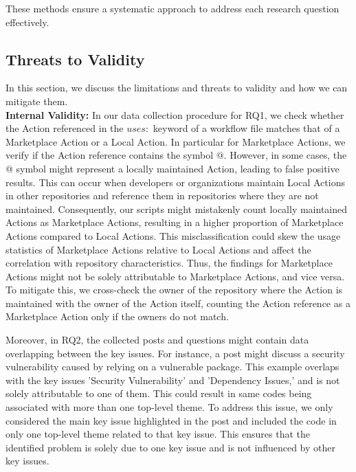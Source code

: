 \documentclass[conference]{IEEEtran}
\begin{document}
These methods ensure a systematic approach to address each research question effectively.\\


    \subsection{Threats to Validity}
        In this section, we discuss the limitations and threats to
        validity and how we can mitigate them.\\

       \textbf{Internal Validity:} In our data collection procedure for RQ1, we check whether the Action referenced in the $uses:$ keyword of a workflow file matches  that of a Marketplace Action or a Local Action. In particular for Marketplace Actions, we verify if the
Action reference contains the symbol $@$. However, in some cases, the $@$ symbol might represent a locally maintained Action, leading to false positive results.  This can occur when developers or organizations maintain Local Actions in other repositories and reference them in repositories where they are not maintained. Consequently, our scripts might mistakenly count locally maintained Actions as Marketplace Actions, resulting in a higher proportion of Marketplace Actions compared to Local Actions. This misclassification could skew the usage statistics of Marketplace Actions relative to Local Actions and affect the correlation with repository characteristics. Thus, the findings for Marketplace Actions might not be solely attributable to Marketplace Actions, and vice versa. To mitigate this, we cross-check the owner of the repository where the Action is maintained with the owner of the Action itself, counting the Action reference as a Marketplace Action only if the owners do not match.

	Moreover, in RQ2, the collected posts and questions might contain data overlapping between the key issues. For instance, a post might discuss a security vulnerability caused by relying on a vulnerable package. This example overlaps with the key issues 'Security Vulnerability' and 'Dependency Issues,' and is not solely attributable to one of them. This could result in same codes being associated with more than one top-level theme. To address this issue, we only considered the main key issue highlighted in the post and included the code in only one top-level theme related to that key issue. This ensures that the identified problem is solely due to one key issue and is not influenced by other key issues.\\
\end{document}
